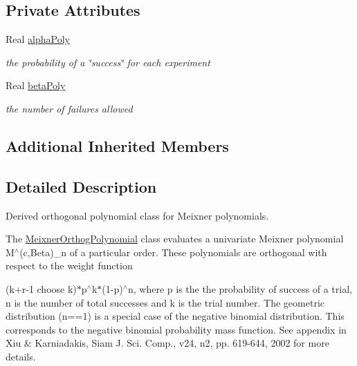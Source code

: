 \subsection*{Private Attributes}
\begin{DoxyCompactItemize}
\item 
Real \hyperlink{classPecos_1_1MeixnerOrthogPolynomial_a11666846719189915a02ac6f1f96e393}{alpha\+Poly}\label{classPecos_1_1MeixnerOrthogPolynomial_a11666846719189915a02ac6f1f96e393}

\begin{DoxyCompactList}\small\item\em the probability of a \char`\"{}success\char`\"{} for each experiment \end{DoxyCompactList}\item 
Real \hyperlink{classPecos_1_1MeixnerOrthogPolynomial_a96c0b0201ca445f95be14ec035b595cb}{beta\+Poly}\label{classPecos_1_1MeixnerOrthogPolynomial_a96c0b0201ca445f95be14ec035b595cb}

\begin{DoxyCompactList}\small\item\em the number of failures allowed \end{DoxyCompactList}\end{DoxyCompactItemize}
\subsection*{Additional Inherited Members}


\subsection{Detailed Description}
Derived orthogonal polynomial class for Meixner polynomials. 

The \hyperlink{classPecos_1_1MeixnerOrthogPolynomial}{Meixner\+Orthog\+Polynomial} class evaluates a univariate Meixner polynomial M$^\wedge$(c,Beta)\+\_\+n of a particular order. These polynomials are orthogonal with respect to the weight function

(k+r-\/1 choose k)$\ast$p$^\wedge$k$\ast$(1-\/p)$^\wedge$n, where p is the the probability of success of a trial, n is the number of total successes and k is the trial number. The geometric distribution (n==1) is a special case of the negative binomial distribution. This corresponds to the negative binomial probability mass function. See appendix in Xiu \& Karniadakis, Siam J. Sci. Comp., v24, n2, pp. 619-\/644, 2002 for more details. 

